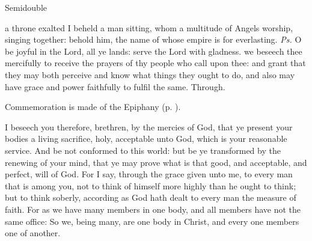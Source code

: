 \begin{inhead}
{Semidouble}
\end{inhead}
\par\noindent
{}

\introit
{} a throne exalted I beheld a man sitting, whom a multitude of Angels worship, singing together: behold him, the name of whose empire is for everlasting. \textit{Ps.} O be joyful in the Lord, all ye lands: serve the Lord with gladness.
\collect
 we beseech thee mercifully to receive the prayers of thy people who call upon thee: and grant that they may both perceive and know what things they ought to do, and also may have grace and power faithfully to fulfil the same. Through.
\begin{rubric}
    Commemoration is made of the Epiphany (p. \pageref{EpiphanyMass}).
\end{rubric}
 I beseech you therefore, brethren, by the mercies of God, that ye present your bodies a living sacrifice, holy, acceptable unto God, which is your reasonable service. And be not conformed to this world: but be ye transformed by the renewing of your mind, that ye may prove what is that good, and acceptable, and perfect, will of God. For I say, through the grace given unto me, to every man that is among you, not to think of himself more highly than he ought to think; but to think soberly, according as God hath dealt to every man the measure of faith. For as we have many members in one body, and all members have not the same office: So we, being many, are one body in Christ, and every one members one of another.

